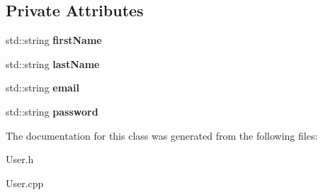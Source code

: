 \subsection*{Private Attributes}
\begin{DoxyCompactItemize}
\item 
\mbox{\label{class_user_aa845739b31aaf9d2e7bdedf829447191}} 
std\+::string {\bfseries first\+Name}
\item 
\mbox{\label{class_user_a10abe0efedb0a600a7be16593a448b12}} 
std\+::string {\bfseries last\+Name}
\item 
\mbox{\label{class_user_ac35b7c63228119cb91acdbd7ed32b8cb}} 
std\+::string {\bfseries email}
\item 
\mbox{\label{class_user_ac2f2e75b15e8eb6cbb030fc85a6cd59f}} 
std\+::string {\bfseries password}
\end{DoxyCompactItemize}


The documentation for this class was generated from the following files\+:\begin{DoxyCompactItemize}
\item 
User.\+h\item 
User.\+cpp\end{DoxyCompactItemize}
